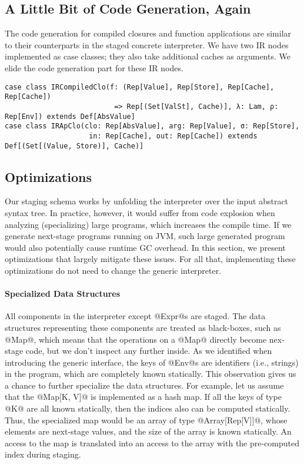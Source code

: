 \subsection{A Little Bit of Code Generation, Again}
The code generation for compiled closures and function applications are similar
to their counterparts in the staged concrete interpreter. We have two IR nodes
implemented as case classes; they also take additional caches as arguments. We
elide the code generation part for these IR nodes.
\begin{lstlisting}
case class IRCompiledClo(f: (Rep[Value], Rep[Store], Rep[Cache], Rep[Cache])
                          => Rep[(Set[ValSt], Cache)], λ: Lam, ρ: Rep[Env]) extends Def[AbsValue]
case class IRApClo(clo: Rep[AbsValue], arg: Rep[Value], σ: Rep[Store],
                    in: Rep[Cache], out: Rep[Cache]) extends Def[(Set[(Value, Store)], Cache)]
\end{lstlisting}

\subsection{Optimizations} \label{staged_ds}

Our staging schema works by unfolding the interpreter over the input abstract
syntax tree. In practice, however, it would suffer from code explosion when
analyzing (specializing) large programs, which increases the compile time. If
we generate next-stage programs running on JVM, such large generated program
would also potentially cause runtime GC overhead. In this section, we present
optimizations that largely mitigate these issues. For all that,
implementing these optimizations do not need to change the generic interpreter.

\paragraph{Specialized Data Structures}

All components in the interpreter except @Expr@s are staged. The data
structures representing these components are treated as black-boxes, such as
@Map@, which means that the operations on a @Map@ directly become nex-stage code,
but we don't inspect any further inside. As we identified when
introducing the generic interface, the keys of @Env@s are identifiers (i.e.,
strings) in the program, which are completely known statically. This
observation gives us a chance to further specialize the data structures.  For
example, let us assume that the @Map[K, V]@ is implemented as a hash map. If
all the keys of type @K@ are all known statically, then the indices also can be
computed statically. Thus, the specialized map would be an array of type
@Array[Rep[V]]@, whose elements are next-stage values, and the size of the array is
known statically. An access to the map is translated into an access to the
array with the pre-computed index during staging.

